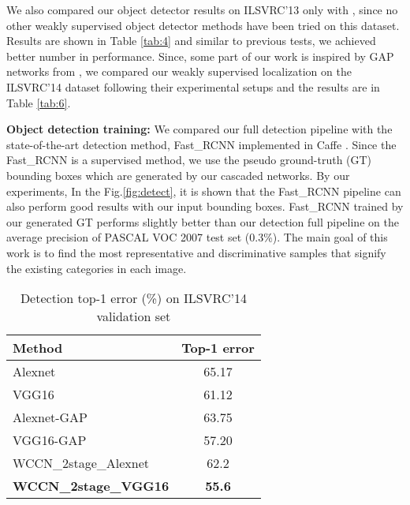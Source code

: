 \documentclass[10pt,twocolumn,letterpaper]{article}
\begin{document}
We also compared our object detector results on ILSVRC'13 only with \cite{li16,wang14}, since no other weakly supervised object detector methods have been tried on this dataset. Results are shown in Table \ref{tab:4} and similar to previous tests, we achieved better number in performance. Since, some part of our work is inspired by GAP networks from \cite{gap_paper}, we compared our weakly supervised localization on the ILSVRC'14 dataset following their experimental setups and the results are in Table \ref{tab:6}. 


\textbf{Object detection training:} We compared our full detection pipeline with the state-of-the-art detection method, Fast\_RCNN implemented in Caffe \cite{caffe}. Since the Fast\_RCNN \cite{fastRCNN} is a supervised method, we use the pseudo ground-truth (GT) bounding boxes which are generated by our cascaded networks. By our experiments, In the Fig.\ref{fig:detect}, it is shown that the Fast\_RCNN pipeline can also perform good results with our input bounding boxes. Fast\_RCNN trained by our generated GT performs slightly better than our detection full pipeline on the average precision of PASCAL VOC 2007 test set (0.3\%). The main goal of this work is to find the most representative and discriminative samples that signify the existing categories in each image.



\begin{table}
\begin{center}
\resizebox{6cm}{!} {
\begin{tabular}{|l|c|}
\hline
Method &  Top-1 error \\
\hline\hline
Alexnet & 65.17 \\
VGG16 & 61.12  \\
Alexnet-GAP \cite{gap_paper}& 63.75  \\
VGG16-GAP \cite{gap_paper} & 57.20 \\
\hline
WCCN\_2stage\_Alexnet& 62.2 \\
\textbf{WCCN\_2stage\_VGG16}& \textbf{55.6} \\
\hline
\end{tabular}}
\end{center}
\caption{Detection top-1 error (\%) on ILSVRC'14 validation set}
  \label{tab:5}
\end{table}
\end{document}
